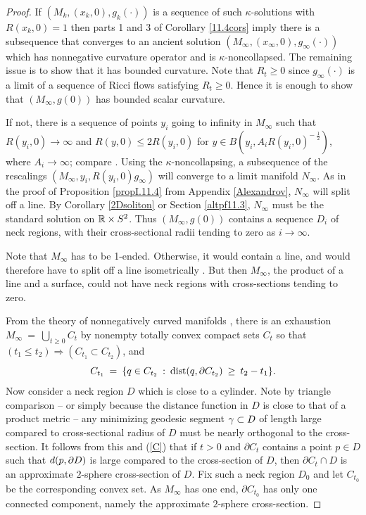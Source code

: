 \begin{proof}
If $(M_k, (x_k, 0), g_k(\cdot))$ is a sequence of such $\kappa$-solutions with
$R(x_k, 0) = 1$ then
parts 1 and 3 of Corollary \ref{11.4cors} imply there is a subsequence that
converges to an ancient solution $(M_\infty, (x_\infty, 0), g_\infty(\cdot))$
which has nonnegative curvature operator and is $\kappa$-noncollapsed.
The remaining issue is to show that it has bounded curvature.
Note that $R_t\geq 0$ since $g_\infty(\cdot)$  is  a limit of a sequence
of Ricci flows satisfying $R_t\geq 0$.
Hence it is
enough to show that $(M_\infty, g(0))$ has bounded scalar curvature.

If not, there is a sequence of points $y_i$ going to infinity in $M_\infty$
such that $R(y_i, 0) \rightarrow \infty$ and
$R(y,0) \le 2 R(y_i,0)$ for $y \in B(y_i, A_i R(y_i,0)^{- \: \frac12})$, where
$A_i \rightarrow \infty$; compare \cite[Lemma 22.2]{Hamilton}.
Using the $\kappa$-noncollapsing, a subsequence of the rescalings
$(M_\infty, y_i, R(y_i, 0) g_\infty)$ will converge to a limit manifold
$N_\infty$.
As in the proof of Proposition \ref{propI.11.4}
from Appendix \ref{Alexandrov},
$N_\infty$ will split off a line.
By Corollary \ref{2Dsoliton} or Section \ref{altpf11.3},
$N_\infty$ must be the standard solution
on ${\mathbb R} \times S^2$. Thus $(M_\infty, g(0))$ contains a sequence
$D_i$ of neck regions, with their
cross-sectional radii
tending to zero as
$i \rightarrow \infty$.

Note that $M_\infty$
has to be 1-ended.  Otherwise, it would contain a line,
and would therefore have to split off a line isometrically
\cite[Theorem 8.17]{Cheeger-Ebin}.
But then $M_\infty$, the product of a line and a surface,
could not have neck regions with cross-sections tending to zero.

From the theory of nonnegatively curved manifolds
\cite[Chapter 8.5]{Cheeger-Ebin},  there is an
exhaustion $M_\infty \: = \: \bigcup_{t\ge 0}C_t$
by nonempty totally convex compact sets $C_t$ so that
$(t_1 \le t_2) \Rightarrow (C_{t_1} \subset C_{t_2})$, and
\begin{equation} \label{C}
C_{t_1} \: = \: \{ q \in C_{t_2} \: : \: \operatorname{dist}(q, \partial C_{t_2})
\: \ge \: t_2 - t_1\}.
\end{equation}
Now consider a
neck region $D$ which is  close to a cylinder.  Note by
triangle comparison -- or simply because the distance function
in $D$ is close to that of a product metric --  any
minimizing geodesic  segment $\gamma\subset D$
of length large compared to cross-sectional radius of $D$ must
be nearly orthogonal to the cross-section.
It follows from this and (\ref{C}) that if $t>0$ and
$\partial C_t$ contains a point $p\in D$ such that $d(p,\partial D)$
is large compared to the cross-section of $D$, then
 $\partial C_t\cap D$ is an approximate $2$-sphere
cross-section of $D$.
Fix such a neck region $D_0$ and let $C_{t_0}$ be the
corresponding convex set.
As $M_\infty$
has one end, $\partial C_{t_0}$ has only one connected
component,
namely the approximate $2$-sphere cross-section.


\end{proof}
